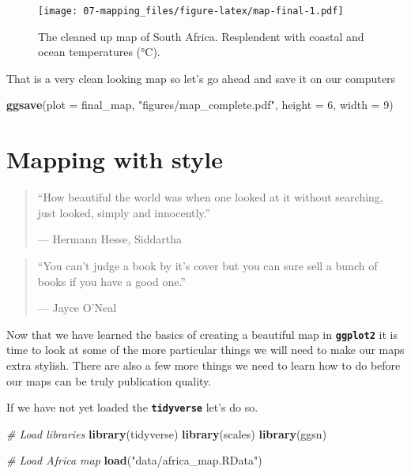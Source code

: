 \documentclass[]{book}
\newenvironment{Shaded}{\begin{snugshade}}{\end{snugshade}}
\newcommand{\KeywordTok}[1]{\textcolor[rgb]{0.13,0.29,0.53}{\textbf{#1}}}
\newcommand{\DataTypeTok}[1]{\textcolor[rgb]{0.13,0.29,0.53}{#1}}
\newcommand{\DecValTok}[1]{\textcolor[rgb]{0.00,0.00,0.81}{#1}}
\newcommand{\StringTok}[1]{\textcolor[rgb]{0.31,0.60,0.02}{#1}}
\newcommand{\CommentTok}[1]{\textcolor[rgb]{0.56,0.35,0.01}{\textit{#1}}}
\newcommand{\NormalTok}[1]{#1}
\theoremstyle{definition}
\theoremstyle{definition}
\theoremstyle{definition}
\theoremstyle{remark}
\begin{document}
\begin{figure}
\centering
\texttt{[image: 07-mapping\_files/figure-latex/map-final-1.pdf]}
\caption{\label{fig:map-final}The cleaned up map of South Africa.
Resplendent with coastal and ocean temperatures (°C).}
\end{figure}

That is a very clean looking map so let's go ahead and save it on our
computers

\begin{Shaded}
\begin{Highlighting}[]
\KeywordTok{ggsave}\NormalTok{(}\DataTypeTok{plot =}\NormalTok{ final_map, }\StringTok{"figures/map_complete.pdf"}\NormalTok{, }\DataTypeTok{height =} \DecValTok{6}\NormalTok{, }\DataTypeTok{width =} \DecValTok{9}\NormalTok{)}
\end{Highlighting}
\end{Shaded}

\chapter{Mapping with style}\label{mapping_style}

\begin{quote}
``How beautiful the world was when one looked at it without searching,
just looked, simply and innocently.''

--- Hermann Hesse, Siddartha
\end{quote}

\begin{quote}
``You can't judge a book by it's cover but you can sure sell a bunch of
books if you have a good one.''

--- Jayce O'Neal
\end{quote}

Now that we have learned the basics of creating a beautiful map in
\textbf{\texttt{ggplot2}} it is time to look at some of the more
particular things we will need to make our maps extra stylish. There are
also a few more things we need to learn how to do before our maps can be
truly publication quality.

If we have not yet loaded the \textbf{\texttt{tidyverse}} let's do so.

\begin{Shaded}
\begin{Highlighting}[]
\CommentTok{# Load libraries}
\KeywordTok{library}\NormalTok{(tidyverse)}
\KeywordTok{library}\NormalTok{(scales)}
\KeywordTok{library}\NormalTok{(ggsn)}

\CommentTok{# Load Africa map}
\KeywordTok{load}\NormalTok{(}\StringTok{"data/africa_map.RData"}\NormalTok{)}
\end{Highlighting}
\end{Shaded}
\end{document}
